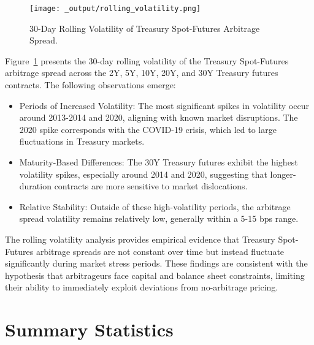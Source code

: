 \documentclass{article}
\begin{document}
\begin{figure}[h]
  \centering
  \texttt{[image: \_output/rolling\_volatility.png]}
  \caption{30-Day Rolling Volatility of Treasury Spot-Futures Arbitrage Spread.}
  \label{fig:rolling_volatility}
\end{figure}



Figure~\ref{fig:rolling_volatility} presents the 30-day rolling volatility of the Treasury Spot-Futures arbitrage spread across the 2Y, 5Y, 10Y, 20Y, and 30Y Treasury futures contracts. The following observations emerge:

\begin{itemize}
    \item Periods of Increased Volatility: The most significant spikes in volatility occur around 2013-2014 and 2020, aligning with known market disruptions. The 2020 spike corresponds with the COVID-19 crisis, which led to large fluctuations in Treasury markets.
    \item Maturity-Based Differences: The 30Y Treasury futures exhibit the highest volatility spikes, especially around 2014 and 2020, suggesting that longer-duration contracts are more sensitive to market dislocations.
    \item Relative Stability: Outside of these high-volatility periods, the arbitrage spread volatility remains relatively low, generally within a 5-15 bps range.
\end{itemize}

The rolling volatility analysis provides empirical evidence that Treasury Spot-Futures arbitrage spreads are not constant over time but instead fluctuate significantly during market stress periods. These findings are consistent with the hypothesis that arbitrageurs face capital and balance sheet constraints, limiting their ability to immediately exploit deviations from no-arbitrage pricing.




\newpage


\section{Summary Statistics}
\end{document}
